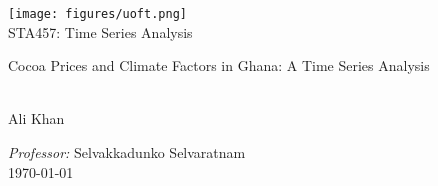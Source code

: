 \documentclass[a4paper,11pt,oneside]{book}
\begin{document}
    
    \frontmatter
    
    \begin{titlepage}      
        \begin{center}
            \texttt{[image: figures/uoft.png]}\\[0.5cm]
            {\LARGE
            STA457: Time Series Analysis}\\[2cm]
			
            \linespread{1.2}\huge {
                Cocoa Prices and Climate Factors in Ghana: A Time Series Analysis
            
            }
            \linespread{1}~\\[5cm]
            {\Large 
                Ali Khan\\
            }


            {\Large
                \emph{Professor:} Selvakkadunko Selvaratnam}\\[1cm] %
            
            
            
            \large\today %
        \end{center}
    \end{titlepage}
    
\end{document}
